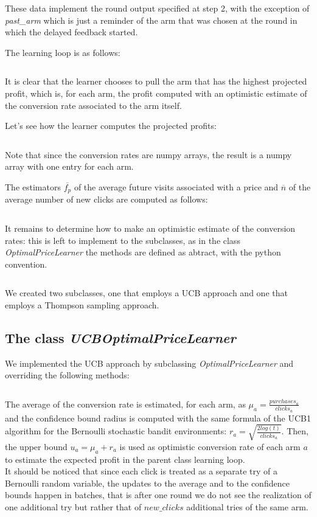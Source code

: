 \documentclass[11pt]{article} %
\begin{document}
These data implement the round output specified at step 2, with the exception of \textit{past\_arm} which is just a reminder of the arm that was chosen at the round in which the delayed feedback started. 

The learning loop is as follows:
\inputminted{python}{code/step3_learning_loop.py}
It is clear that the learner chooses to pull the arm that has the highest projected profit, which is, for each arm, the profit computed with an optimistic estimate of the conversion rate associated to the arm itself.

Let's see how the learner computes the projected profits:
\inputminted{python}{code/step3_projected_profits.py}
Note that since the conversion rates are numpy arrays, the result is a numpy array with one entry for each arm.

The estimators $\overline{f_p}$ of the average future visits associated with a price and $\overline{n}$ of the average number of new clicks are computed as follows:
\inputminted{python}{code/step3_estimates.py}
It remains to determine how to make an optimistic estimate of the conversion rates: this is left to implement to the subclasses, as in the class \textit{OptimalPriceLearner} the methods are defined as abtract, with the python convention.
\inputminted{python}{code/step3_conversion_rates.py}
We created two subclasses, one that employs a UCB approach and one that employs a Thompson sampling approach.\\

\begin{samepage}
\subsection{The class \textit{UCBOptimalPriceLearner}}
We implemented the UCB approach by subclassing  \textit{OptimalPriceLearner} and overriding the following methods:
\inputminted{python}{code/step3_ucb.py}
\end{samepage}
The average of the conversion rate is estimated, for each arm, as $\mu_a=\frac{purchases_a}{clicks_a}$ and the confidence bound radius is computed with the same formula of the UCB1 algorithm for the Bernoulli stochastic bandit environments: $r_a=\sqrt{\frac{2log(t)}{clicks_a}}$.
Then, the upper bound $u_a = \mu_a+r_a$ is used as optimistic conversion rate of each arm $a$ to estimate the expected profit in the parent class learning loop.\\

It should be noticed that since each click is treated as a separate try of a Bernoulli random variable, the updates to the average and to the confidence bounds happen in batches, that is after one round we do not see the realization of one additional try but rather that of $new\_clicks$ additional tries of the same arm.\\
\end{document}
